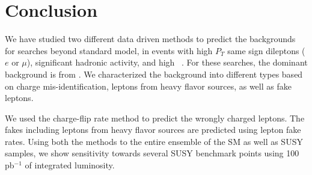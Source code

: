 \section{Conclusion}
\label{sec:conclusion}
We have studied two different data driven methods to predict the backgrounds for  
searches beyond standard model, in events with high $P_T$ same sign dileptons
($e$ or $\mu$), significant hadronic activity, and high \met~. 
For these searches, the dominant background is from \ttbar. We characterized
the background into different types based on charge mis-identification,
leptons from heavy flavor sources, as well as fake leptons.

We used the charge-flip rate method to predict the wrongly charged 
leptons. The fakes including leptons from heavy flavor sources are predicted 
using lepton fake rates. Using both the methods to the entire ensemble of the
SM as well as SUSY samples, we show sensitivity towards several SUSY benchmark 
points using 100 pb$^{-1}$ of integrated luminosity.


